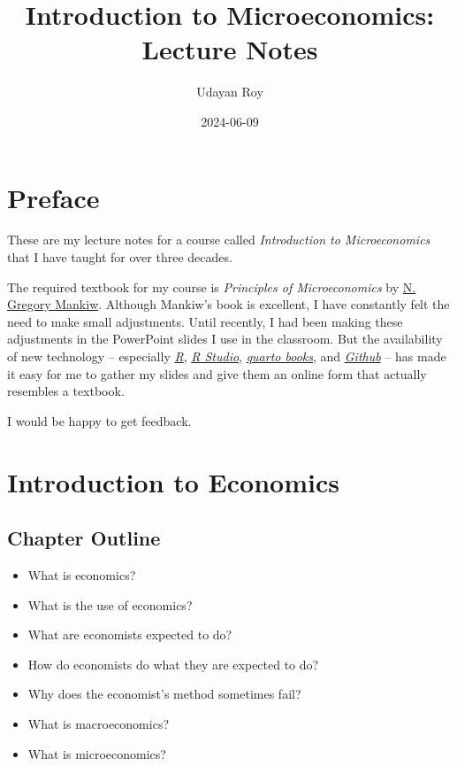 \documentclass[
  letterpaper,
]{book}
\title{Introduction to Microeconomics: Lecture Notes}
\author{Udayan Roy}
\date{2024-06-09}
\renewcommand*\contentsname{Table of contents}
\newcommand\contentsname{Table of contents}
\begin{document}
\frontmatter
\maketitle

\renewcommand*\contentsname{Table of contents}
{
\setcounter{tocdepth}{2}
\tableofcontents
}
\mainmatter
{}

\chapter*{Preface}\label{preface}


These are my lecture notes for a course called \emph{Introduction to
Microeconomics} that I have taught for over three decades.

The required textbook for my course is \emph{Principles of
Microeconomics} by
\href{https://simple.wikipedia.org/wiki/N._Gregory_Mankiw}{N. Gregory
Mankiw}. Although Mankiw's book is excellent, I have constantly felt the
need to make small adjustments. Until recently, I had been making these
adjustments in the PowerPoint slides I use in the classroom. But the
availability of new technology -- especially
\href{https://www.r-project.org/}{\emph{R}},
\href{https://posit.co/download/rstudio-desktop/}{\emph{R Studio}},
\href{https://quarto.org/docs/books/}{\emph{quarto books}}, and
\href{https://github.com/}{\emph{Github}} -- has made it easy for me to
gather my slides and give them an online form that actually resembles a
textbook.

I would be happy to get feedback.


\chapter{Introduction to Economics}\label{sec-introduction}

\section{Chapter Outline}\label{chapter-outline}

\begin{itemize}
\item
  What is economics?
\item
  What is the use of economics?
\item
  What are economists expected to do?
\item
  How do economists do what they are expected to do?
\item
  Why does the economist's method sometimes fail?
\item
  What is macroeconomics?
\item
  What is microeconomics?
\end{itemize}
\end{document}
